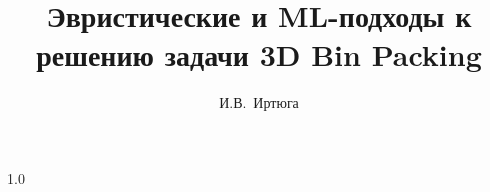 \documentclass[14pt,a4paper]{extarticle}
\title{Эвристические и ML-подходы к\\решению задачи 3D Bin Packing}
\author{И.В.~Иртюга}
\begin{document}
\begin{spacing}{1.0}
\maketitle
\end{spacing}


\clearpage
\tableofcontents








\end{document}
